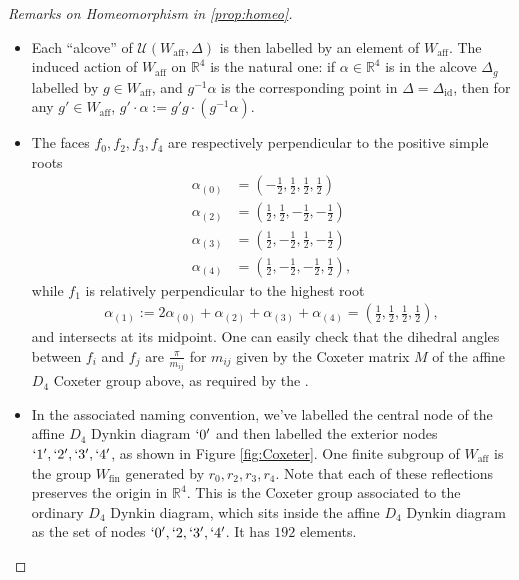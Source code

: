 \documentclass[12pt,letterpaper,reqno]{amsart}
\def\bm#1{#1}%
\theoremstyle{remark}
\theoremstyle{definition}
\numberwithin{thm}{section}
\numberwithin{equation}{section}
\numberwithin{figure}{section}
\newcommand{\R}{\ensuremath{\mathbb R}}
\newcommand{\bfalpha}{\ensuremath{\bm \alpha}}
\newcommand{\Simplex}{\Delta}
\begin{document}
\begin{proof}[Remarks on Homeomorphism in \ref{prop:homeo}]\hfill
  \begin{itemize}
    \item Each ``alcove'' of $\mathcal{U}(W_{\mathrm{aff}}, \Simplex)$ is then labelled by an element of $W_{\mathrm{aff}}$. The induced action of $W_{\mathrm{aff}}$ on $\mathbb{R}^4$ is the natural one: if $\bfalpha \in \R^4$ is in the alcove $\Simplex_g$ labelled by $g \in W_{\mathrm{aff}}$, and $g^{-1}\bfalpha$ is the corresponding point in $\Simplex=\Simplex_{\mathrm{id}}$, then for any $g' \in W_{\mathrm{aff}}$, $g'\cdot \bfalpha := g'g \cdot (g^{-1} \bfalpha)$.
    \item 
The faces $f_0, f_2, f_3, f_4$ are respectively perpendicular to the positive simple roots
\begin{align*}
\alpha_{(0)}&=\left(-\frac{1}{2},  \frac{1}{2},  \frac{1}{2}, \frac{1}{2}\right)\\
\alpha_{(2)}&=\left(\frac{1}{2},  \frac{1}{2}, - \frac{1}{2}, -\frac{1}{2}\right)\\
\alpha_{(3)}&= \left(\frac{1}{2}, - \frac{1}{2}, \frac{1}{2}, -\frac{1}{2}\right)\\
\alpha_{(4)}&=\left(\frac{1}{2}, - \frac{1}{2}, - \frac{1}{2}, \frac{1}{2}\right),
\end{align*}
while $f_1$ is relatively perpendicular to the highest root
\begin{align}
\alpha_{(1)}:= 2 \alpha_{(0)} + \alpha_{(2)} +\alpha_{(3)}+ \alpha_{(4)}=\left(\frac{1}{2},  \frac{1}{2},  \frac{1}{2}, \frac{1}{2}\right),
\end{align}
and intersects at its midpoint. One can easily check that
 the dihedral angles between $f_i$ and $f_j$  are $\frac{\pi}{m_{ij}}$ for $m_{ij}$ given by the Coxeter matrix $M$ of the affine $D_4$ Coxeter group above, as required by the \cite[Theorem 6.4.3]{Davis}. 
  
\item In the associated naming convention, we've labelled the central node of the affine $D_4$ Dynkin diagram $`0'$ and then labelled the exterior nodes $`1', `2', `3', `4'$, as shown in Figure \ref{fig:Coxeter}. 
 One finite subgroup of $W_{\mathrm{aff}}$ is the group $W_{\mathrm{fin}}$ generated by $r_0, r_2, r_3, r_4$. Note that each of these reflections preserves the origin in $\R^4$. This is the Coxeter group associated to the ordinary $D_4$ Dynkin diagram, which sits inside the affine $D_4$ Dynkin diagram as the set of nodes $`0', `2, `3', `4'$. It has $192$ elements.  
 


\end{itemize}
\end{proof}
\end{document}

